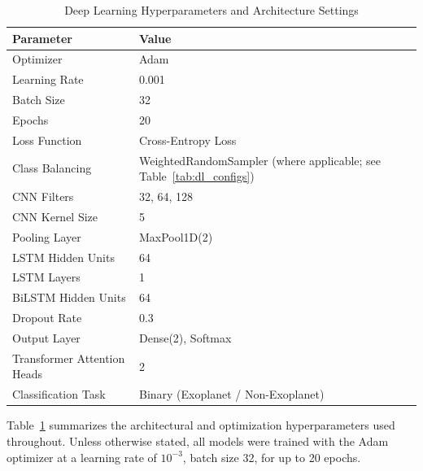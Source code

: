 \documentclass[preprint,11pt,times]{elsarticle}
\begin{document}
\begin{table}[htbp]
\centering
\caption{Deep Learning Hyperparameters and Architecture Settings}
\label{tab:hyperparams}
\small

\begin{tabular}{p{4cm} p{8cm}}
\toprule
Parameter & Value \\
\midrule

Optimizer & Adam \\

Learning Rate & 0.001 \\

Batch Size & 32 \\

Epochs & 20 \\

Loss Function & Cross-Entropy Loss \\

Class Balancing & WeightedRandomSampler (where applicable; see Table~\ref{tab:dl_configs}) \\

CNN Filters & 32, 64, 128 \\

CNN Kernel Size & 5 \\

Pooling Layer & MaxPool1D(2) \\

LSTM Hidden Units & 64 \\

LSTM Layers & 1 \\

BiLSTM Hidden Units & 64 \\

Dropout Rate & 0.3 \\

Output Layer & Dense(2), Softmax \\

Transformer Attention Heads & 2 \\

Classification Task & Binary (Exoplanet / Non-Exoplanet) \\

\bottomrule
\end{tabular}
\end{table}
Table~\ref{tab:hyperparams} summarizes the architectural and optimization hyperparameters used throughout. Unless otherwise stated, all models were trained with the Adam optimizer at a learning rate of $10^{-3}$, batch size 32, for up to 20 epochs.
\end{document}
